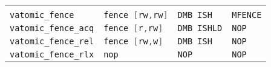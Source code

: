\begin{tabular}{l|lll}
    \hline\\[-6pt]
    \lstinline[language=C,style=compact]|vatomic_fence| & \lstinline[language={C},style=compact]|fence [rw,rw]| & \lstinline[style=compact]|DMB ISH|  & \lstinline[style=compact]|MFENCE|\\
    \lstinline[language=C,style=compact]|vatomic_fence_acq| & \lstinline[language={C},style=compact]|fence [r,rw]| & \lstinline[style=compact]|DMB ISHLD| & \lstinline[style=compact]|NOP |\\
    \lstinline[language=C,style=compact]|vatomic_fence_rel| & \lstinline[language={C},style=compact]|fence [rw,w]| & \lstinline[style=compact]|DMB ISH| & \lstinline[style=compact]|NOP |\\
    \lstinline[language=C,style=compact]|vatomic_fence_rlx| & \lstinline[language={C},style=compact]|nop| & \lstinline[style=compact]|NOP| & \lstinline[style=compact]|NOP|
\end{tabular}
